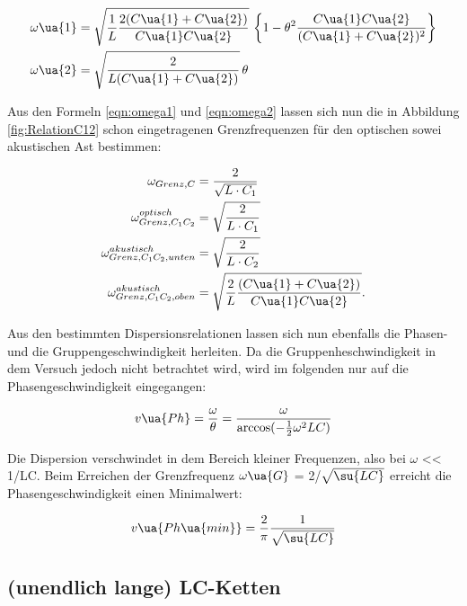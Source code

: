 \begin{align}
  \label{eqn:omega1}
  \omega\ua{1} &= \sqrt{ \frac{1}{L} \frac{2(C\ua{1} + C\ua{2})}{C\ua{1}C\ua{2}}} \,
  \left\{ 1 - \theta^2 \frac{C\ua{1}C\ua{2}}{(C\ua{1} + C\ua{2})^2} \right\} \\
  \label{eqn:omega2}
  \omega\ua{2} &= \sqrt{ \frac{2}{L(C\ua{1} + C\ua{2})}} \, \theta
\end{align}

Aus den Formeln \eqref{eqn:omega1} und \eqref{eqn:omega2} lassen sich nun die in
Abbildung \ref{fig:RelationC12} schon eingetragenen Grenzfrequenzen für den optischen
sowei akustischen Ast bestimmen:

\begin{align}
  \label{eqn:omega_C_grenz}
  \omega_{Grenz,C} &= \frac{2}{\sqrt{L\cdot C_1}} \\
  \label{eqn:omega_C_1_grenz}
  \omega_{Grenz,C_1C_2}^{optisch} &= \sqrt{\frac{2}{L\cdot C_1}}  \\
  \label{eqn:omega_C_2_grenz_unten}
  \omega_{Grenz,C_1C_2,unten}^{akustisch} &= \sqrt{\frac{2}{L\cdot C_2}} \\
  \label{eqn:omega_C_2_grenz_oben}
  \omega_{Grenz,C_1C_2,oben}^{akustisch} &= \sqrt{\frac{2}{L} \frac{(C\ua{1}+C\ua{2})}{C\ua{1}C\ua{2}}}. \\
\end{align}

Aus den bestimmten Dispersionsrelationen lassen sich nun ebenfalls die Phasen- und
die Gruppengeschwindigkeit herleiten. Da die Gruppenheschwindigkeit in dem Versuch
jedoch nicht betrachtet wird, wird im folgenden nur auf die Phasengeschwindigkeit
eingegangen:

\begin{equation}
  v\ua{Ph} = \frac{\omega}{\theta} = \frac{\omega}{\arccos(-\frac{1}{2}\omega^2LC)}
\end{equation}

Die Dispersion verschwindet in dem Bereich kleiner Frequenzen, also bei $\omega$
<< 1/LC. Beim Erreichen der Grenzfrequenz $\omega\ua{G}$ = 2/$\sqrt{\su{LC}}$ erreicht
die Phasengeschwindigkeit einen Minimalwert:

\begin{equation}
  v\ua{Ph\ua{min}} =  \frac{2}{\pi} \frac{1}{\sqrt{\su{LC}}}
  \label{eqn:Phasengeschwindigkeit}
\end{equation}

\subsection{(unendlich lange) LC-Ketten}

